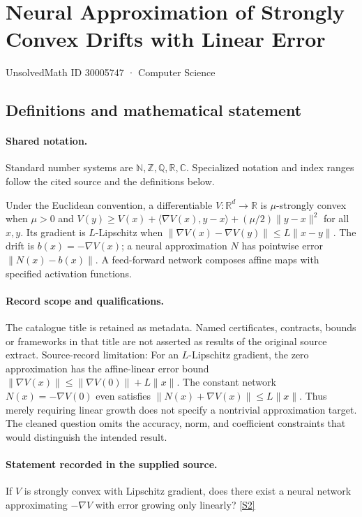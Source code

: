 \documentclass[11pt]{article}
\newcommand{\sref}[2]{\hyperlink{source:#1:#2}{[S#2]}}
\begin{document}
\setcounter{section}{30005746}
\section{Neural Approximation of Strongly Convex Drifts with Linear Error}\label{30005747}
{\small\sffamily UnsolvedMath ID 30005747 · Computer Science}
\subsection{Definitions and mathematical statement}

\paragraph{Shared notation.}Standard number systems are $\mathbb N,\mathbb Z,\mathbb Q,\mathbb R,\mathbb C$. Specialized notation and index ranges follow the cited source and the definitions below.


Under the Euclidean convention, a differentiable $V:\mathbb R^d\to\mathbb R$ is $\mu$-strongly convex when $\mu>0$ and $V(y)\ge V(x)+\langle\nabla V(x),y-x\rangle+(\mu/2)\|y-x\|^2$ for all $x,y$. Its gradient is $L$-Lipschitz when $\|\nabla V(x)-\nabla V(y)\|\le L\|x-y\|$. The drift is $b(x)=-\nabla V(x)$; a neural approximation $N$ has pointwise error $\|N(x)-b(x)\|$. A feed-forward network composes affine maps with specified activation functions.
\paragraph{Record scope and qualifications.}
The catalogue title is retained as metadata. Named certificates, contracts, bounds or frameworks in that title are not asserted as results of the original source extract.
Source-record limitation: For an $L$-Lipschitz gradient, the zero approximation has the affine-linear error bound $\|\nabla V(x)\|\le\|\nabla V(0)\|+L\|x\|$. The constant network $N(x)=-\nabla V(0)$ even satisfies $\|N(x)+\nabla V(x)\|\le L\|x\|$. Thus merely requiring linear growth does not specify a nontrivial approximation target. The cleaned question omits the accuracy, norm, and coefficient constraints that would distinguish the intended result.
\paragraph{Statement recorded in the supplied source.}
If $V$ is strongly convex with Lipschitz gradient, does there exist a neural network approximating $-\nabla V$ with error growing only linearly? \sref{30005747}{2}
\end{document}
